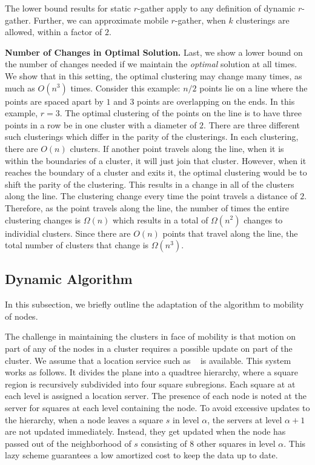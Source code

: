 \begin{theorem}
The lower bound results for static $r$-gather apply to any definition of dynamic $r$-gather.  Further, we can approximate mobile $r$-gather, when $k$ clusterings are allowed, within a factor of $2$.
\end{theorem}

\medskip\noindent\textbf{Number of Changes in Optimal Solution.} Last, we show a lower bound on the number of changes needed if we maintain the \emph{optimal} solution at all times. We show that in this setting, the optimal clustering may change many times, as much as $O(n^3)$ times.  Consider this example: $n/2$ points lie on a line where the points are spaced apart by $1$ and $3$ points are overlapping on the ends.  In this example, $r = 3$.  The optimal clustering of the points on the line is to have three points in a row be in one cluster with a diameter of $2$.  There are three different such clusterings which differ in the parity of the clusterings.  In each clustering, there are $O(n)$ clusters.  If another point travels along the line, when it is within the boundaries of a cluster, it will just join that cluster.  However, when it reaches the boundary of a cluster and exits it, the optimal clustering would be to shift the parity of the clustering.  This results in a change in all of the clusters along the line.  The clustering change every time the point travels a distance of $2$.  Therefore, as the point travels along the line, the number of times the entire clustering changes is $\Omega(n)$ which results in a total of $\Omega(n^2)$ changes to individial clusters.  Since there are $O(n)$ points that travel along the line, the total number of clusters that change is $\Omega(n^3)$.





\subsection{Dynamic Algorithm}\label{subsec:dynamic}

In this subsection, we briefly outline the adaptation of the algorithm to mobility of nodes.

 The challenge in maintaining the clusters in face of mobility is that motion on part of any of the nodes in a cluster requires a possible update on part of the cluster. We assume that a location service such as ~\cite{abraham04LLS} is available. This system works as follows. It divides the plane into a quadtree hierarchy, where a square region is recursively subdivided into four square subregions. Each square at at each level is assigned a location server. The presence of each node is noted at the server for squares at each level containing the node. To avoid excessive updates to the hierarchy, when a node leaves a square $s$ in level $\alpha$, the servers at level $\alpha+1$ are not updated immediately. Instead, they get updated when the node has passed out of the neighborhood of $s$ consisting of $8$ other squares in level $\alpha$. This lazy scheme guarantees a low amortized cost to keep the data up to date. 

